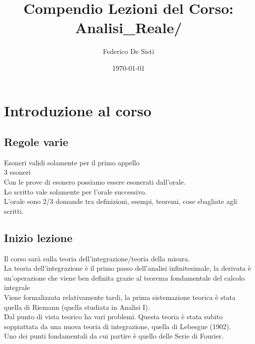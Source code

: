 \documentclass{article}
\title{Compendio Lezioni del Corso: Analisi_Reale/}
\date{\today}
\author{Federico De Sisti}
\begin{document}
\maketitle
\maketitle
	\newpage
	\section{Introduzione al corso}
	\subsection{Regole varie}
	Esoneri validi solamente per il primo appello\\
	3 esoneri\\
	Con le prove di esonero possiamo essere esonerati dall'orale.\\
	Lo scritto vale solamente per l'orale successivo.\\
	L'orale sono 2/3 domande tra definizioni, esempi, teoremi, cose sbagliate agli scritti.\\
	\subsection{Inizio lezione}
	Il corso sarà sulla teoria dell'integrazione/teoria della misura.\\
	La teoria dell'integrazione è il primo passo dell'analisi infinitesimale, la derivata è un'operazione che viene ben definita grazie al teorema fondamentale del calcolo integrale\\
	Viene formalizzata relativamente tardi, la prima sistemazione teorica è stata quella di Riemann (quella studiata in Analisi I).\\
	Dal punto di vista teorico ha vari problemi. Questa teoria è stata subito soppiattata da una nuova teoria di integrazione, quella di Lebesgue (1902).\\
	Uno dei punti fondamentali da cui partire è quello delle Serie di Fourier.\\
\end{document}
